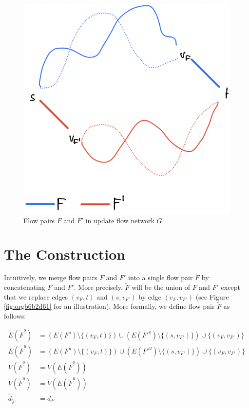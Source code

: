 \documentclass[fontsize=11pt,paper=a4]{book}
\begin{document}
\begin{figure}[htbp]
\centering
\includegraphics[width=.9\linewidth]{../assets/Screen Shot 2023-02-19 at 13.28.41.png}
\caption{\label{fig:org944c669}Flow pairs \(F\) and \(F'\) in update flow network \(G\)}
\end{figure}

\section{The Construction}
\label{sec:orgee0dbe0}

Intuitively, we merge flow pairs \(F\) and \(F'\) into a single flow pair \(\tilde{F}\) by concatenating \(F\) and \(F'\).
More precisely, \(\tilde{F}\) will be the union of \(F\) and \(F'\) except that we replace edges \((v_F,t)\) and \((s,v_{F'})\) by edge \((v_F,v_{F'})\) (see Figure \ref{fig:orgb6b2d61} for an illustration).
More formally, we define flow pair \(\tilde{F}\) as follows:

\begin{align*}
\tilde{E}(\tilde{F}^o)&=\left(E(F^o)\setminus\{(v_F,t)\}\right)\cup\left(E(F'^o)\setminus\{(s,v_{F'})\}\right)\cup\{(v_F,v_{F'})\}\\
\tilde{E}(\tilde{F}^u)&=\left(E(F^u)\setminus\{(v_F,t)\}\right)\cup\left(E(F'^u)\setminus\{(s,v_{F'})\}\right)\cup\{(v_F,v_{F'})\}\\
\tilde{V}(\tilde{F}^o)&=\tilde{V}(\tilde{E}(\tilde{F}^o))\\
\tilde{V}(\tilde{F}^u)&=\tilde{V}(\tilde{E}(\tilde{F}^u))\\
\tilde{d}_{\tilde{F}}&=d_F
\end{align*}
\end{document}
